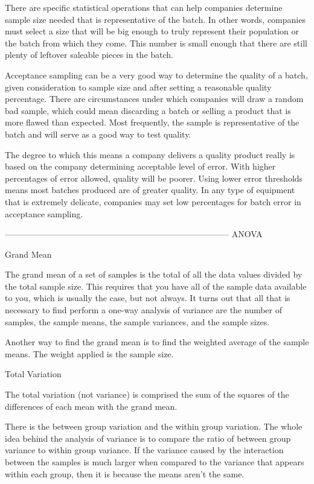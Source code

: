 There are specific statistical operations that can help companies determine sample size needed that is representative of the batch. In other words, companies must select a size that will be big enough to truly represent their population or the batch from which they come. This number is small enough that there are still plenty of leftover saleable pieces in the batch.


Acceptance sampling can be a very good way to determine the quality of a batch, given consideration to sample size and after setting a reasonable quality percentage. There are circumstances under which companies will draw a random bad sample, which could mean discarding a batch or selling a product that is more flawed than expected. Most frequently, the sample is representative of the batch and will serve as a good way to test quality.


The degree to which this means a company delivers a quality product really is based on the company determining acceptable level of error. With higher percentages of error allowed, quality will be poorer. Using lower error thresholds means most batches produced are of greater quality. In any type of equipment that is extremely delicate, companies may set low percentages for batch error in acceptance sampling.



--------------------------------------------------------------------------------
ANOVA



Grand Mean


The grand mean of a set of samples is the total of all the data values divided by the total sample size. This requires that you have all of the sample data available to you, which is usually the case, but not always. It turns out that all that is necessary to find perform a one-way analysis of variance are the number of samples, the sample means, the sample variances, and the sample sizes.

Another way to find the grand mean is to find the weighted average of the sample means. The weight applied is the sample size.


Total Variation


The total variation (not variance) is comprised the sum of the squares of the differences of each mean with the grand mean.

There is the between group variation and the within group variation. The whole idea behind the analysis of variance is to compare the ratio of between group variance to within group variance. If the variance caused by the interaction between the samples is much larger when compared to the variance that appears within each group, then it is because the means aren't the same.

